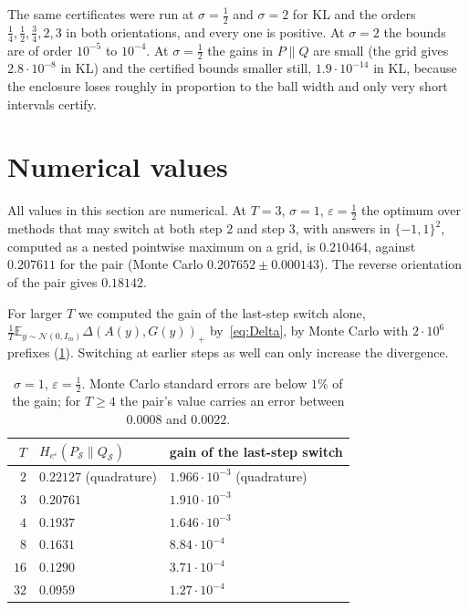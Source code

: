 \documentclass[11pt]{amsart}
\theoremstyle{definition}
\theoremstyle{remark}
\newcommand{\N}{\mathcal N}
\newcommand{\E}{\mathbb E}
\newcommand{\He}{H_{e^{\varepsilon}}}
\begin{document}
The same certificates were run at $\sigma=\frac12$ and $\sigma=2$ for KL and the orders $\frac14,\frac12,\frac34,2,3$ in both orientations, and every one is positive. At $\sigma=2$ the bounds are of order $10^{-5}$ to $10^{-4}$. At $\sigma=\frac12$ the gains in $P\|Q$ are small (the grid gives $2.8\cdot10^{-8}$ in KL) and the certified bounds smaller still, $1.9\cdot10^{-14}$ in KL, because the enclosure loses roughly in proportion to the ball width and only very short intervals certify.

\section{Numerical values}\label{sec:numerics}

All values in this section are numerical. At $T=3$, $\sigma=1$, $\varepsilon=\frac12$ the optimum over methods that may switch at both step $2$ and step $3$, with answers in $\{-1,1\}^2$, computed as a nested pointwise maximum on a grid, is $0.210464$, against $0.207611$ for the pair (Monte Carlo $0.207652\pm0.000143$). The reverse orientation of the pair gives $0.18142$.

For larger $T$ we computed the gain of the last-step switch alone, $\frac1T\E_{y\sim\N(0,I_m)}\Delta(A(y),G(y))_+$ by~\eqref{eq:Delta}, by Monte Carlo with $2\cdot10^6$ prefixes (\cref{tab:T}). Switching at earlier steps as well can only increase the divergence.

\begin{table}[ht]
\centering
\begin{tabular}{rll}
\toprule
$T$ & $\He(P_{\mathcal S}\|Q_{\mathcal S})$ & gain of the last-step switch\\
\midrule
$2$ & $0.22127$ (quadrature) & $1.966\cdot10^{-3}$ (quadrature)\\
$3$ & $0.20761$ & $1.910\cdot10^{-3}$\\
$4$ & $0.1937$ & $1.646\cdot10^{-3}$\\
$8$ & $0.1631$ & $8.84\cdot10^{-4}$\\
$16$ & $0.1290$ & $3.71\cdot10^{-4}$\\
$32$ & $0.0959$ & $1.27\cdot10^{-4}$\\
\bottomrule
\end{tabular}
\medskip
\caption{$\sigma=1$, $\varepsilon=\frac12$. Monte Carlo standard errors are below $1\%$ of the gain; for $T\ge4$ the pair's value carries an error between $0.0008$ and $0.0022$.}
\label{tab:T}
\end{table}
\end{document}
